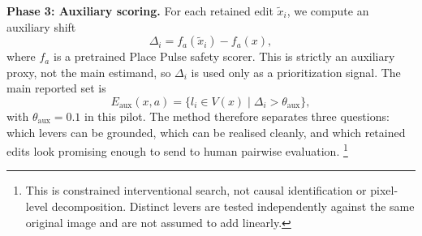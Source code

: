 \noindent\textbf{Phase 3: Auxiliary scoring.}
For each retained edit $\tilde{x}_i$, we compute an auxiliary shift
\begin{equation}
  \Delta_i = f_a(\tilde{x}_i) - f_a(x),
\end{equation}
where $f_a$ is a pretrained Place Pulse safety scorer. This is strictly
an auxiliary proxy, not the main estimand, so $\Delta_i$ is used only
as a prioritization signal. The main reported set is
\begin{equation}
  E_{\mathrm{aux}}(x,a) = \{ l_i \in V(x) \mid \Delta_i > \theta_{\mathrm{aux}} \},
\end{equation}
with $\theta_{\mathrm{aux}}=0.1$ in this pilot. The method therefore
separates three questions: which levers can be grounded, which can be
realised cleanly, and which retained edits look promising enough to send
to human pairwise evaluation.%
\footnote{This is constrained interventional search, not causal
identification or pixel-level decomposition. Distinct levers are tested
independently against the same original image and are not assumed to add
linearly.}
